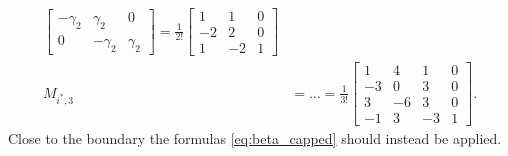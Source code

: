 \begin{subequations}
\begin{align}
\begin{bmatrix}
      - \gamma_{2} & \gamma_{2}   & 0          \\
      0            & - \gamma_{2} & \gamma_{2}
    \end{bmatrix} = \frac{1}{2!} \begin{bmatrix} 1 & 1 & 0 \\ -2 & 2 & 0 \\ 1 & -2 & 1  \end{bmatrix} \\
    M_{i^*, 3} & = \hdots = \frac{1}{3!} \begin{bmatrix} 1 & 4 & 1 & 0 \\ -3 & 0 & 3 & 0 \\ 3 & -6 & 3 & 0 \\ -1 & 3 & -3 & 1 \end{bmatrix}.
  \end{align}
\end{subequations}
Close to the boundary the formulas \eqref{eq:beta_capped} should instead be applied.


